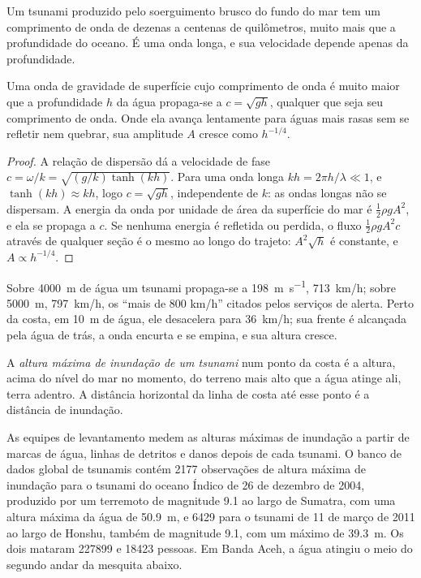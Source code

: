 Um tsunami produzido pelo soerguimento brusco do fundo do mar tem um comprimento de onda de dezenas a centenas de
quilômetros, muito mais que a profundidade do oceano. É uma onda longa, e sua velocidade depende apenas
da profundidade.

\begin{proposition}\label{prop:b2:geological-hazards:long-waves}
Uma onda de gravidade de superfície cujo comprimento de onda é muito maior que a profundidade $h$ da água propaga-se a
$c = \sqrt{gh}$, qualquer que seja seu comprimento de onda. Onde ela avança lentamente para águas mais rasas sem
se refletir nem quebrar, sua amplitude $A$ cresce como $h^{-1/4}$.
\end{proposition}

\begin{proof}
A relação de dispersão dá a velocidade de fase $c = \omega/k = \sqrt{(g/k)\tanh(kh)}$. Para uma onda
longa $kh = 2\pi h/\lambda \ll 1$, e $\tanh(kh) \approx kh$, logo $c = \sqrt{gh}$, independente de
$k$: as ondas longas não se dispersam. A energia da onda por unidade de área da superfície do mar é $\frac12
\rho g A^2$, e ela se propaga a $c$. Se nenhuma energia é refletida ou perdida, o fluxo $\frac12\rho g A^2
c$ através de qualquer seção é o mesmo ao longo do trajeto: $A^2 \sqrt{h}$ é constante, e $A \propto
h^{-1/4}$.
\end{proof}

Sobre \qty{4000}{m} de água um tsunami propaga-se a \qty{198}{m.s^{-1}}, \qty{713}{km/h}; sobre
\qty{5000}{m}, \qty{797}{km/h}, os ``mais de 800 km/h'' citados pelos serviços de alerta. Perto da
costa, em \qty{10}{m} de água, ele desacelera para \qty{36}{km/h}; sua frente é alcançada pela água
de trás, a onda encurta e se empina, e sua altura cresce.

\begin{definition}\label{def:b2:geological-hazards:tsunami}
A \emph{altura máxima de inundação de um tsunami} num ponto da costa é a altura, acima do
nível do mar no momento, do terreno mais alto que a água atinge ali, terra adentro. A distância
horizontal da linha de costa até esse ponto é a distância de inundação.
\end{definition}

As equipes de levantamento medem as alturas máximas de inundação a partir de marcas de água, linhas de detritos e danos depois de cada tsunami. O
banco de dados global de tsunamis contém \num{2177} observações de altura máxima de inundação para o tsunami do oceano Índico de
26 de dezembro de 2004, produzido por um terremoto de magnitude 9.1 ao largo de Sumatra, com uma altura máxima da água de
\qty{50.9}{m}, e \num{6429} para o tsunami de 11 de março de 2011 ao largo de Honshu, também de magnitude 9.1,
com um máximo de \qty{39.3}{m}. Os dois mataram \num{227899} e \num{18423} pessoas. Em Banda Aceh,
a água atingiu o meio do segundo andar da mesquita abaixo.


